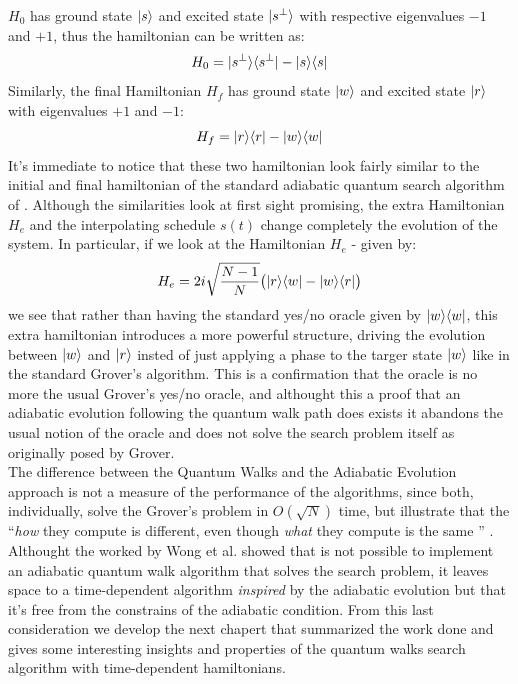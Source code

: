 $H_0$ has ground state ${|{s}\rangle}$ and excited state ${|{s^\perp}\rangle}$ with respective eigenvalues $-1$ and $+1$, thus the hamiltonian can be written as:
\begin{equation}
  H_0  = {|{s^\perp}\rangle}{\langle{s^\perp}|} - {|{s}\rangle}{\langle{s}|}
\end{equation}
Similarly, the final Hamiltonian $H_f$ has ground state ${|{w}\rangle}$ and excited state ${|{r}\rangle}$ with eigenvalues $+1$ and $-1$:
\begin{equation}
  H_f =  {|{r}\rangle}{\langle{r}|} - {|{w}\rangle}{\langle{w}|}
\end{equation}
It's immediate to notice that these two hamiltonian look fairly similar to the initial and final hamiltonian of the standard adiabatic quantum search algorithm of . Although the similarities look at first sight promising, the extra Hamiltonian $H_e$ and the interpolating schedule $s(t)$ change completely the evolution of the system. In particular, if we look at the Hamiltonian $H_e$ - given by:
\begin{equation}
  H_e = 2i\sqrt{\frac{N-1}{N}}\big({|{r}\rangle}{\langle{w}|} - {|{w}\rangle}{\langle{r}|}\big)
\end{equation}
we see that rather than having the standard yes/no oracle given by ${|{w}\rangle}{\langle{w}|}$, this extra hamiltonian introduces a more powerful structure, driving the evolution between ${|{w}\rangle}$ and ${|{r}\rangle}$ insted of just applying a phase to the targer state ${|{w}\rangle}$ like in the standard Grover's algorithm. This is a confirmation that the oracle is no more the usual Grover's yes/no oracle, and althought this a proof that an adiabatic evolution following the quantum walk path does exists it abandons the usual notion of the oracle and does not solve the search problem itself as originally posed by Grover. \\

\noindent
The difference between the Quantum Walks and the Adiabatic Evolution approach is not a measure of the performance of the algorithms, since both, individually, solve the Grover's problem in $O(\sqrt{N})$ time, but illustrate that the ``\textit{how} they compute is different, even though \textit{what} they compute is the same '' \cite{Wong2016}.\\Althought the worked by Wong et al. showed that is not possible to implement an adiabatic quantum walk algorithm that solves the search problem, it leaves space to a time-dependent algorithm \textit{inspired} by the adiabatic evolution but that it's free from the constrains of the adiabatic condition. From this last consideration we develop the next chapert that summarized the work done and gives some interesting insights and properties of the quantum walks search algorithm with time-dependent hamiltonians.
